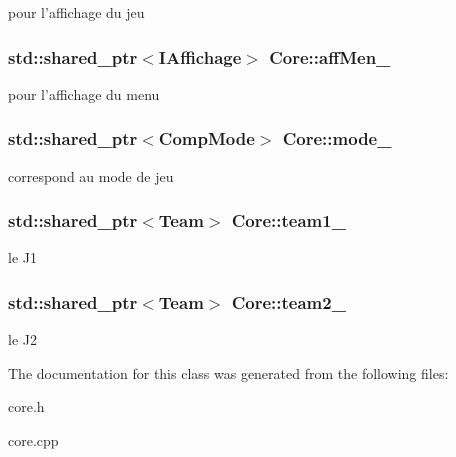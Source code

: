 pour l'affichage du jeu \hypertarget{classCore_a2d9a9ba8be0844338f67e8feab39ba9e}{
\subsubsection[{aff\+Men\+\_\+}]{\setlength{\rightskip}{0pt plus 5cm}std\+::shared\+\_\+ptr$<${\bf I\+Affichage}$>$ Core\+::aff\+Men\+\_\+\hspace{0.3cm}{\ttfamily [protected]}}}\label{classCore_a2d9a9ba8be0844338f67e8feab39ba9e}
pour l'affichage du menu \hypertarget{classCore_ab7d2af28daa772c12d0a2cea6e65f887}{
\subsubsection[{mode\+\_\+}]{\setlength{\rightskip}{0pt plus 5cm}std\+::shared\+\_\+ptr$<${\bf Comp\+Mode}$>$ Core\+::mode\+\_\+\hspace{0.3cm}{\ttfamily [protected]}}}\label{classCore_ab7d2af28daa772c12d0a2cea6e65f887}
correspond au mode de jeu \hypertarget{classCore_a299a0b1ed101953462d17c6e0528b006}{
\subsubsection[{team1\+\_\+}]{\setlength{\rightskip}{0pt plus 5cm}std\+::shared\+\_\+ptr$<${\bf Team}$>$ Core\+::team1\+\_\+\hspace{0.3cm}{\ttfamily [protected]}}}\label{classCore_a299a0b1ed101953462d17c6e0528b006}
le J1 \hypertarget{classCore_a4e9f0791fb0449a8c4b0ccce607a11da}{
\subsubsection[{team2\+\_\+}]{\setlength{\rightskip}{0pt plus 5cm}std\+::shared\+\_\+ptr$<${\bf Team}$>$ Core\+::team2\+\_\+\hspace{0.3cm}{\ttfamily [protected]}}}\label{classCore_a4e9f0791fb0449a8c4b0ccce607a11da}
le J2 

The documentation for this class was generated from the following files\+:\begin{DoxyCompactItemize}
\item 
core.\+h\item 
core.\+cpp\end{DoxyCompactItemize}
